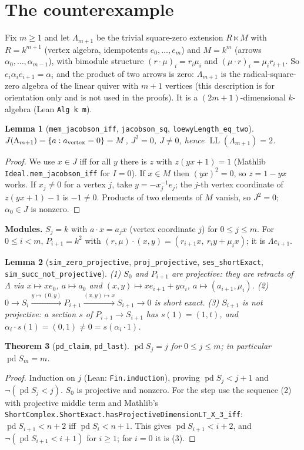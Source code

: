 \documentclass[11pt]{article}
\newtheorem{theorem}{Theorem}
\newtheorem{lemma}[theorem]{Lemma}
\theoremstyle{definition}
\newcommand{\pd}{\operatorname{pd}}
\newcommand{\LL}{\operatorname{LL}}
\begin{document}
\section{The counterexample}

Fix $m\ge 1$ and let $\Lambda_{m+1}$ be the trivial square-zero extension $R\ltimes M$ with
$R=k^{m+1}$ (vertex algebra, idempotents $e_0,\dots,e_m$) and $M=k^m$ (arrows
$\alpha_0,\dots,\alpha_{m-1}$), with bimodule structure $(r\cdot\mu)_i=r_i\mu_i$ and
$(\mu\cdot r)_i=\mu_i r_{i+1}$. So $e_i\alpha_ie_{i+1}=\alpha_i$ and the product of two arrows is
zero: $\Lambda_{m+1}$ is the radical-square-zero algebra of the linear quiver with $m+1$ vertices
(this description is for orientation only and is not used in the proofs). It is a
$(2m+1)$-dimensional $k$-algebra (Lean \texttt{Alg k m}).

\begin{lemma}[\texttt{mem\_jacobson\_iff}, \texttt{jacobson\_sq}, \texttt{loewyLength\_eq\_two}]
$J(\Lambda_{m+1})=\{a : a_{\rm vertex}=0\}=M$, $J^2=0$, $J\neq0$, hence $\LL(\Lambda_{m+1})=2$.
\end{lemma}
\begin{proof}
We use $x\in J$ iff for all $y$ there is $z$ with $z(yx+1)=1$ (Mathlib
\texttt{Ideal.mem\_jacobson\_iff} for $I=0$). If $x\in M$ then $(yx)^2=0$, so $z=1-yx$ works. If
$x_j\neq 0$ for a vertex $j$, take $y=-x_j^{-1}e_j$; the $j$-th vertex coordinate of $z(yx+1)-1$ is
$-1\ne 0$. Products of two elements of $M$ vanish, so $J^2=0$; $\alpha_0\in J$ is nonzero.
\end{proof}

\textbf{Modules.} $S_j=k$ with $a\cdot x=a_jx$ (vertex coordinate $j$) for $0\le j\le m$. For
$0\le i<m$, $P_{i+1}=k^2$ with $(r,\mu)\cdot(x,y)=(r_{i+1}x,\ r_iy+\mu_ix)$; it is $\Lambda e_{i+1}$.

\begin{lemma}[\texttt{sim\_zero\_projective}, \texttt{proj\_projective}, \texttt{ses\_shortExact},
\texttt{sim\_succ\_not\_projective}]
(1) $S_0$ and $P_{i+1}$ are projective: they are retracts of $\Lambda$ via
$x\mapsto xe_0$, $a\mapsto a_0$ and $(x,y)\mapsto xe_{i+1}+y\alpha_i$, $a\mapsto(a_{i+1},\mu_i)$.
(2) $0\to S_i\xrightarrow{y\mapsto(0,y)}P_{i+1}\xrightarrow{(x,y)\mapsto x}S_{i+1}\to0$ is short exact.
(3) $S_{i+1}$ is not projective: a section $s$ of $P_{i+1}\to S_{i+1}$ has $s(1)=(1,t)$, and
$\alpha_i\cdot s(1)=(0,1)\neq 0=s(\alpha_i\cdot 1)$.
\end{lemma}

\begin{theorem}[\texttt{pd\_claim}, \texttt{pd\_last}]
$\pd S_j=j$ for $0\le j\le m$; in particular $\pd S_m=m$.
\end{theorem}
\begin{proof}
Induction on $j$ (Lean: \texttt{Fin.induction}), proving $\pd S_j<j+1$ and $\neg(\pd S_j<j)$.
$S_0$ is projective and nonzero. For the step use the sequence (2) with projective middle term and
Mathlib's \texttt{ShortComplex.ShortExact.hasProjectiveDimensionLT\_X\_3\_iff}: $\pd S_{i+1}<n+2$ iff
$\pd S_i<n+1$. This gives $\pd S_{i+1}<i+2$, and $\neg(\pd S_{i+1}<i+1)$ for $i\ge1$; for $i=0$ it
is (3).
\end{proof}
\end{document}
